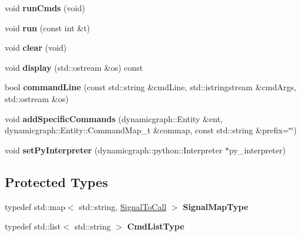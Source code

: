 \begin{DoxyCompactItemize}
void {\bfseries run\+Cmds} (void)
\item 
\mbox{\label{classdynamic__graph_1_1PeriodicCall_a03b883cf9713378452c51601c0137285}} 
void {\bfseries run} (const int \&t)
\item 
\mbox{\label{classdynamic__graph_1_1PeriodicCall_a008800cf257d3cf9f16d56d47a2a08a7}} 
void {\bfseries clear} (void)
\item 
\mbox{\label{classdynamic__graph_1_1PeriodicCall_a898d1809ddd0a820ee4e278a4b8fe47e}} 
void {\bfseries display} (std\+::ostream \&os) const
\item 
\mbox{\label{classdynamic__graph_1_1PeriodicCall_a042c2a1139e779cd308c9d95b51a8485}} 
bool {\bfseries command\+Line} (const std\+::string \&cmd\+Line, std\+::istringstream \&cmd\+Args, std\+::ostream \&os)
\item 
\mbox{\label{classdynamic__graph_1_1PeriodicCall_a51669d6bc8fa3fd4ccc386f2b9649d57}} 
void {\bfseries add\+Specific\+Commands} (dynamicgraph\+::\+Entity \&ent, dynamicgraph\+::\+Entity\+::\+Command\+Map\+\_\+t \&commap, const std\+::string \&prefix=\char`\"{}\char`\"{})
\item 
\mbox{\label{classdynamic__graph_1_1PeriodicCall_a6b6534066019b42f1cf671bb0cb24ec5}} 
void {\bfseries set\+Py\+Interpreter} (dynamicgraph\+::python\+::\+Interpreter $\ast$py\+\_\+interpreter)
\end{DoxyCompactItemize}
\subsection*{Protected Types}
\begin{DoxyCompactItemize}
\item 
\mbox{\label{classdynamic__graph_1_1PeriodicCall_a9c67e590dcf07f26d5453b14c6611c21}} 
typedef std\+::map$<$ std\+::string, \hyperlink{structdynamic__graph_1_1PeriodicCall_1_1SignalToCall}{Signal\+To\+Call} $>$ {\bfseries Signal\+Map\+Type}
\item 
\mbox{\label{classdynamic__graph_1_1PeriodicCall_aa67980b32127f810065222b18bc0662c}} 
typedef std\+::list$<$ std\+::string $>$ {\bfseries Cmd\+List\+Type}
\end{DoxyCompactItemize}
